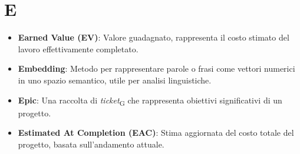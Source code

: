 \section*{E}  
\begin{itemize}
    \item \textbf{Earned Value (EV)}: Valore guadagnato, rappresenta il costo stimato del lavoro effettivamente completato.
    \item \textbf{Embedding}: Metodo per rappresentare parole o frasi come vettori numerici in uno spazio semantico, utile per analisi linguistiche.
    \item \textbf{Epic}: Una raccolta di \textit{ticket}\textsubscript{G} che rappresenta obiettivi significativi di un progetto.
    \item \textbf{Estimated At Completion (EAC)}: Stima aggiornata del costo totale del progetto, basata sull'andamento attuale.
\end{itemize}
